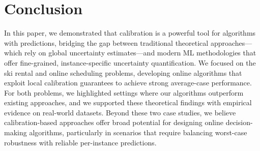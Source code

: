 \section{Conclusion}
In this paper, we demonstrated that calibration
is a powerful tool for algorithms with predictions, bridging the gap between traditional theoretical approaches---which rely on global uncertainty estimates---and modern ML methodologies that offer fine-grained, instance-specific uncertainty quantification.
We focused on the ski rental and online scheduling problems, developing online algorithms that exploit local calibration guarantees to achieve strong average-case performance. For both problems, we highlighted settings where our algorithms outperform existing approaches, and we supported these theoretical findings with empirical evidence on real-world datasets. Beyond these two case studies, we believe calibration-based approaches offer broad potential for designing online decision-making algorithms, particularly in scenarios that require balancing worst-case robustness with reliable per-instance predictions.